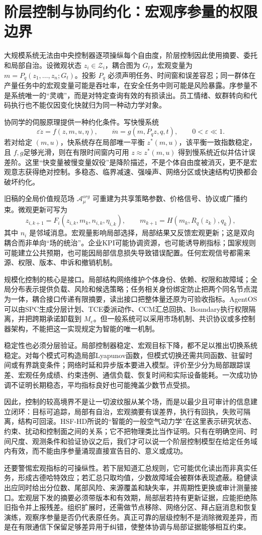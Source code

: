 \section{阶层控制与协同约化：宏观序参量的权限边界}
\label{sec:hierarchical_slaving_principle}

大规模系统无法由中央控制器逐项操纵每个自由度，阶层控制因此使用摘要、委托和局部自治。设微观状态 $z_i\in\mathcal Z_i$，耦合图为 $G_t$，宏观变量为 $m=P_q(z_1,\ldots,z_n;G_t)$。投影 $P_q$ 必须声明任务、时间窗和误差容忍；同一群体在产量任务中的宏观变量可能是吞吐率，在安全任务中则可能是风险暴露。序参量不是系统唯一的“灵魂”，而是对特定查询有效的有损读出。员工情绪、蚁群转向和代码执行也不能仅因变化快就归为同一种动力学对象。

协同学的伺服原理提供一种约化条件。写快慢系统
\[
 \varepsilon\dot z=f(z,m,u,\eta),\qquad \dot m=g(m,P_qz,q,t),\qquad0<\varepsilon\ll1.
\]
若对给定 $(m,u)$，快系统存在局部唯一平衡 $z^*(m,u)$，该平衡一致指数稳定，且 $f,g$足够光滑，则在有限时间窗内可用 $z\approx z^*(m,u)$ 得到慢系统近似并估计误差阶。这里“快变量被慢变量奴役”是降阶描述，不是个体自由度被消灭，更不是宏观意志获得绝对控制。多稳态、临界减速、强噪声、网络分区或快速结构切换都会破坏约化。

旧稿的全局价值规范场 $\mathcal A_\mu^{org}$ 可重建为共享策略参数、价格信号、协议或广播约束。微观更新可写为
\[
 z_{i,k+1}=F_i(z_{i,k},m_k,n_{i,k},\eta_{i,k}),\qquad m_{k+1}=H(m_k,R_q(z_k),q_k),
\]
其中 $n_i$ 是邻域消息。宏观量影响局部选择，局部结果又反馈宏观更新；这是双向耦合而非单向“场的统治”。企业KPI可能协调资源，也可能诱导刷指标；国家规则可能建立公共预期，也可能因局部信息损失导致错误配置。任何宏观信号都需来源、权限、版本、申诉和撤销机制。

规模化控制的核心是接口。局部结构网络维护个体身份、依赖、权限和故障域；全局分布表示提供负载、风险和候选策略；任务相关身份绑定防止把两个同名节点混为一体，耦合接口传递有限摘要，读出接口把整体量还原为可验收指标。AgentOS可以由SPC生成分层计划、TCE委派动作、CCM汇总回执、Boundary执行权限隔离，并把跨期承诺卸载到 $M_e$。但一般系统可以采用市场机制、共识协议或多控制器架构，不能把这一实现规定为智能的唯一机制。

稳定性也必须分层验证。局部控制器稳定、宏观目标下降，都不足以推出切换系统稳定。对每个模式可构造局部Lyapunov函数，但模式切换还需共同函数、驻留时间或有界跳变条件；网络时延和异步版本要进入模型。评价至少分为局部跟踪误差、宏观任务成绩、约束违例、通信负载、恢复时间和实际设备能耗。一次成功协调不证明长期稳态，平均指标良好也可能掩盖少数节点受损。

因此，控制的较高境界不是让一切波纹服从某个场，而是以最少且可审计的信息建立闭环：目标可追踪，局部有自治，宏观摘要有误差界，执行有回执，失败可隔离，结构可回滚。HSF-HD所说的“智能的一般空气动力学”在这里表示研究状态、约束、扰动和控制面之间的关系；它不把物理类比当作证明。只有在明确空间、时间尺度、观测条件和验证协议之后，我们才可以说一个阶层控制模型在给定任务域内有效，而不能由序参量涌现直接宣告目的、意义或成功。

还要警惕宏观指标的可操纵性。若下层知道汇总规则，它可能优化读出而非真实任务，形成古德哈特效应；若汇总只取均值，少数故障域会被群体表现遮蔽。稳健读出应同时给出分位数、尾部风险、来源覆盖和缺失率，并周期性更换或审计测量接口。宏观层下发的摘要必须带版本和有效期，局部层若持有更新证据，应能拒绝陈旧指令并上报残差。组织扩展时，还需做节点移除、网络分区、拜占庭消息和恢复演练，观察序参量是否仍代表原任务。真正可靠的层级控制不是消除微观差异，而是在有限通信下保留足够差异用于纠错，使整体协调与局部证据能够相互约束。

